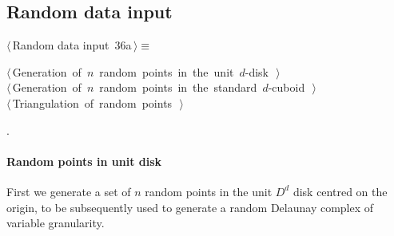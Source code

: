 \documentclass[11pt,oneside]{article}	%
\begin{document}
\subsection{Random data input} 

\begin{flushleft} \small \label{scrap45}
\protect{}$\langle\,$Random data input\nobreak\ {\footnotesize 36a}$\,\rangle\equiv$
\vspace{-1ex}
\begin{list}{}{} \item
\mbox{}\verb@@\hbox{$\langle\,$Generation of $n$ random points in the unit $d$-disk\nobreak\ {\footnotesize {}}$\,\rangle$}\verb@@\\
\mbox{}\verb@@\hbox{$\langle\,$Generation of $n$ random points in the standard $d$-cuboid\nobreak\ {\footnotesize {}}$\,\rangle$}\verb@@\\
\mbox{}\verb@@\hbox{$\langle\,$Triangulation of random points\nobreak\ {\footnotesize {}}$\,\rangle$}\verb@@\\
\mbox{}\verb@@{\NWsep}
\end{list}
\vspace{-1ex}
\footnotesize\addtolength{\baselineskip}{-1ex}
\begin{list}{}{\setlength{\itemsep}{-\parsep}\setlength{\itemindent}{-\leftmargin}}
\item {\NWtxtMacroNoRef}.
\end{list}
\end{flushleft}

\paragraph{Random points in unit disk} 
First we generate a  set of $n$ random points in the unit $D^d$ disk centred on the origin, to be subsequently used to generate a random Delaunay complex of variable granularity.
\end{document}

